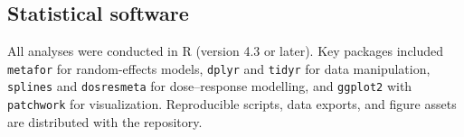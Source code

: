 \subsection{Statistical software}
All analyses were conducted in R (version 4.3 or later). Key packages included \texttt{metafor} for random-effects models, \texttt{dplyr} and \texttt{tidyr} for data manipulation, \texttt{splines} and \texttt{dosresmeta} for dose--response modelling, and \texttt{ggplot2} with \texttt{patchwork} for visualization. Reproducible scripts, data exports, and figure assets are distributed with the repository.


